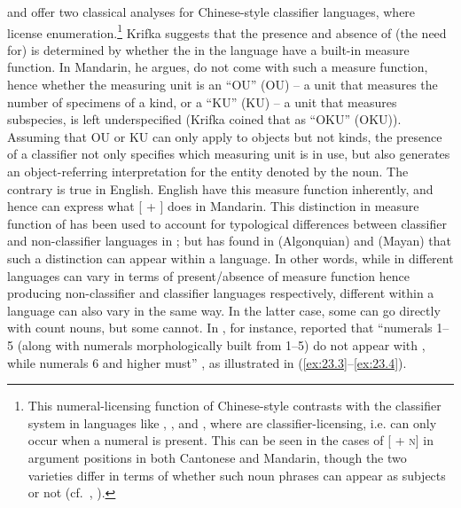 \documentclass[output=paper]{langsci/langscibook}
\begin{document}
\citet{Krifka1995} and \citet{Chierchia1998} offer two classical analyses for
Chinese-style classifier languages, where 
license enumeration.\footnote{This numeral-licensing function of Chinese-style
     contrasts with the classifier system in
    languages like  \citep{Watanabe2006}, 
    \parencite{VazquezRojasMaldonado2012}, and  \citep{Massam2009},
    where  are classifier-licensing, i.e.   can
    only occur when a numeral is present. This can be seen in the
    cases of [\Clf{} + \textsc{n}] in argument positions in both Cantonese and
    Mandarin, though the two varieties differ in terms of whether such noun
    phrases can appear as subjects or not (cf.\ \citealt{ChengSybesma1999},
\citealt{Sio2006}).} Krifka suggests that the presence and absence of (the need
for)  is determined by whether the  in the
language have a built-in measure function. In Mandarin, he argues,
 do not come with such a measure function, hence whether the
measuring unit is an \enquote{\glsdesc{OU}} (\gls{OU}) -- a unit
that measures the number of specimens of a kind, or a \enquote{\glsdesc{KU}}
(\gls{KU}) -- a unit that measures subspecies, is left
underspecified (Krifka coined that as \enquote{\glsdesc{OKU}}
(\gls{OKU})). Assuming that \gls{OU} or \gls{KU} can only apply
to objects but not kinds, the presence of a classifier not only
specifies which measuring unit is in use, but also generates an
object-referring interpretation for the entity denoted by the noun. The
contrary is true in English. English  have this measure function
inherently, and hence can express what [\Num{} + \Clf] does in
Mandarin.  This distinction in measure function of 
has been used to account for typological differences between
classifier and non-classifier languages in \citet{Krifka1995};
but \citet{BaleCoon2014} has found in  (Algonquian) and 
(Mayan) that such a distinction can appear within a language. In other words,
while  in different languages can vary in terms of
present/absence of measure function hence producing non-classifier and
classifier languages respectively, different  within a language
can also vary in the same way. In the latter case, some  can go
directly with count nouns, but some cannot. In , for instance,
\citeauthor{BaleCoon2014} reported that “numerals 1--5 (along with numerals
morphologically built from 1--5) do not appear with , while
numerals 6 and higher must” \parencite[700]{BaleCoon2014}, as illustrated in
(\ref{ex:23.3}--\ref{ex:23.4}).
\end{document}
